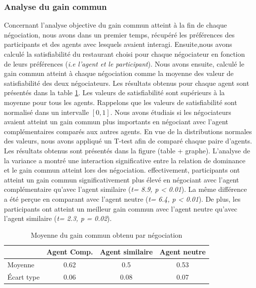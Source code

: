 		\subsubsection{Analyse du gain commun } Concernant l'analyse objective du gain commun atteint à la fin de chaque négociation, nous avons dans un premier temps, récupéré les préférences des participants et des agents avec lesquels avaient interagi. 
		Ensuite,nous avons calculé la satisfiabilité du restaurant choisi pour chaque négociateur en fonction de leurs préférences (\textit{i.e l'agent et le participant}). Nous avons ensuite, calculé le gain commun atteint à chaque négociation comme la moyenne des valeur de satisfiabilité des deux négociateurs.  Les résultats obtenus pour chaque agent sont présentés dans la table \ref{tab:gain}. Les valeurs de satisfiabilité sont supérieurs à la moyenne pour tous les agents. Rappelons que les valeurs de satisfiabilité sont normalisé dans un intervalle $[0, 1]$. Nous avons étudiais si les négociateurs avaient atteint un gain commun plus importants en négociant avec l'agent complémentaires comparés aux autres agents. En vue de la distributions normales des valeurs, nous avons appliqué un T-test afin de comparé chaque paire d'agents. Les résultats obtenus sont présentés dans la figure (table + graphe). L'analyse de la variance a montré une interaction significative entre la relation de dominance et le gain commun atteint lors des négociation. effectivement, participants ont atteint un gain commun significativement plus élevé en négociant avec l'agent complémentaire qu'avec l'agent similaire (\emph{t= 8.9, p < 0.01}). La même différence a été perçue en comparant avec l'agent neutre (\emph{t= 6.4, p < 0.01}).
		De plus, les participants ont atteint un meilleur gain commun avec l'agent neutre qu'avec l'agent similaire (\emph{t= 2.3, p = 0.02}).
		

		\begin{table}[h]
			\caption{Moyenne du gain commun obtenu par négociation} 
			\centering
			
			\begin{tabular}{ l c c c}
				\hline
				\textbf{ }& \textbf{Agent Comp.} & \textbf{Agent similaire} & \textbf{Agent neutre} \\ 
				\hline
				\newline Moyenne & 0.62& 0.5 & 0.53 \\
				\newline Écart type & 0.06 & 0.08 & 0.07 \\
				\hline
				
			\end{tabular}
			
			\label{tab:gain}
		\end{table}
	
